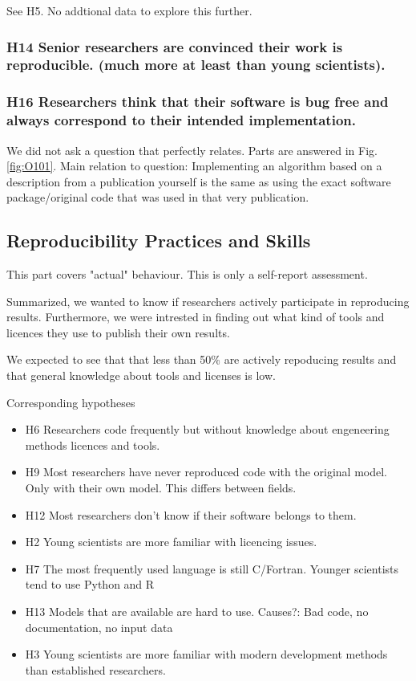 \documentclass{article}
\begin{document}
See H5. No addtional data to explore this further.

\subsubsection{H14 Senior researchers are convinced their work is reproducible. (much more at least than young scientists).}



\subsubsection{H16 Researchers think that their software is bug free and always correspond to their intended implementation.}
We did not ask a question that perfectly relates. Parts are answered in Fig. \ref{fig:O101}.
Main relation to question: Implementing an algorithm based on a description from a publication yourself is the same as using the exact software package/original code that was used in that very publication.



\newpage

\subsection{Reproducibility Practices and Skills}
This part covers "actual" behaviour. This is only a self-report assessment.

Summarized, we wanted to know if researchers actively participate in reproducing results. Furthermore, we were intrested in finding out what kind of tools and licences they use to publish their own results.

We expected to see that that less than 50\% are actively repoducing results and that general knowledge about tools and licenses is low.

Corresponding hypotheses
\begin{itemize}
	\item H6 Researchers code frequently but without knowledge about engeneering methods licences and tools.
	\item H9 Most researchers have never reproduced code with the original model. Only with their own model. This differs between fields.
	\item H12 Most researchers don't know if their software belongs to them.
	\item H2 Young scientists are more familiar with licencing issues.
	\item H7 The most frequently used language is still C/Fortran. Younger scientists tend to use Python and R
	\item H13 Models that are available are hard to use. Causes?: Bad code, no documentation, no input data
	\item H3 Young scientists are more familiar with modern development methods than established researchers.
\end{itemize}
\end{document}
